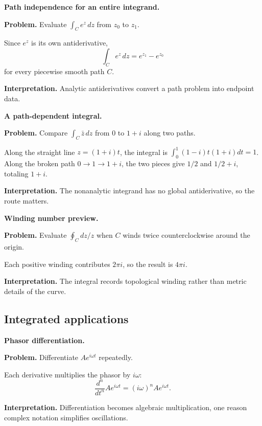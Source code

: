 \begin{workedexample}
\textbf{Path independence for an entire integrand.}\par
\textbf{Problem.} Evaluate $\int_C e^z\,dz$ from $z_0$ to $z_1$.
\begin{solution}
Since $e^z$ is its own antiderivative,
\[
\int_Ce^z\,dz=e^{z_1}-e^{z_0}
\]
for every piecewise smooth path $C$.

\textbf{Interpretation.} Analytic antiderivatives convert a path problem into endpoint data.
\end{solution}
\end{workedexample}

\begin{workedexample}
\textbf{A path-dependent integral.}\par
\textbf{Problem.} Compare $\int_C\bar z\,dz$ from $0$ to $1+i$ along two paths.
\begin{solution}
Along the straight line $z=(1+i)t$, the integral is $\int_0^1(1-i)t(1+i)dt=1$. Along the broken path $0\to1\to1+i$, the two pieces give $1/2$ and $1/2+i$, totaling $1+i$.

\textbf{Interpretation.} The nonanalytic integrand has no global antiderivative, so the route matters.
\end{solution}
\end{workedexample}

\begin{workedexample}
\textbf{Winding number preview.}\par
\textbf{Problem.} Evaluate $\oint_C dz/z$ when $C$ winds twice counterclockwise around the origin.
\begin{solution}
Each positive winding contributes $2\pi i$, so the result is $4\pi i$.

\textbf{Interpretation.} The integral records topological winding rather than metric details of the curve.
\end{solution}
\end{workedexample}

\subsection{Integrated applications}

\begin{workedexample}
\textbf{Phasor differentiation.}\par
\textbf{Problem.} Differentiate $Ae^{i\omega t}$ repeatedly.
\begin{solution}
Each derivative multiplies the phasor by $i\omega$:
\[
\frac{d^n}{dt^n}Ae^{i\omega t}=(i\omega)^nAe^{i\omega t}.
\]

\textbf{Interpretation.} Differentiation becomes algebraic multiplication, one reason complex notation simplifies oscillations.
\end{solution}
\end{workedexample}

